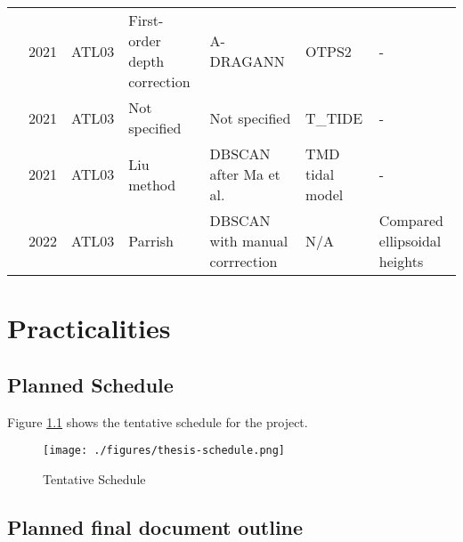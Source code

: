 \begin{landscape}
\begin{table}
\begin{tabular}{p{3.7cm}llp{3.2cm}p{3.5cm}ll}
                  \citeauthor{Cao2021}               & 2021 & ATL03   & First-order depth correction  & A-DRAGANN                      & OTPS2           & -                            \\
                  \citeauthor{Lee2021}               & 2021 & ATL03   & Not specified                 & Not specified                  & T\_TIDE         & -                            \\
                  \citeauthor{Liu2021}               & 2021 & ATL03   & Liu method                    & DBSCAN after Ma et al.         & TMD tidal model & -                            \\
                  \citeauthor{LeQuilleuc2022b}       & 2022 & ATL03   & Parrish                       & DBSCAN with manual corrrection & N/A             & Compared ellipsoidal heights \\
                  \bottomrule
            \end{tabular}
      \end{table}

\end{landscape}
\restoregeometry

\chapter{Practicalities}

\section{Planned Schedule}

Figure \ref{project-schedule} shows the tentative schedule for the project.
\begin{landscape}

      \begin{figure}
            \centering
            \texttt{[image: ./figures/thesis-schedule.png]}
            \caption{Tentative Schedule}
            \label{project-schedule}
      \end{figure}

\end{landscape}
\section{Planned final document outline}
